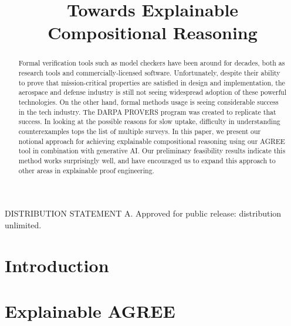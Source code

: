 \documentclass[conference]{IEEEtran}
\begin{document}
\title{Towards Explainable Compositional Reasoning}

\author{
	}


\maketitle

\begin{abstract}

Formal verification tools such as model checkers have been around for decades, both as research tools and commercially-licensed software.  Unfortunately, despite their ability to prove that mission-critical properties are satisfied in design and implementation, the aerospace and defense industry is still not seeing widespread adoption of these powerful technologies. 
%
On the other hand, formal methods usage is seeing considerable success in the tech industry.
The DARPA PROVERS program was created to replicate that success.
%
In looking at the possible reasons for slow uptake, difficulty in understanding counterexamples tops the list of multiple surveys.
%
In this paper, we present our notional approach for achieving explainable compositional reasoning using our AGREE tool in combination with generative AI.  Our preliminary feasibility results indicate this method works surprisingly well, and have encouraged us to expand this approach to other areas in explainable proof engineering.  
	

\end{abstract}

DISTRIBUTION STATEMENT A. Approved for public release: distribution unlimited.

\section{Introduction}
\label{sec:introduction}


\section{Explainable AGREE}
\label{sec:agree}

\end{document}
